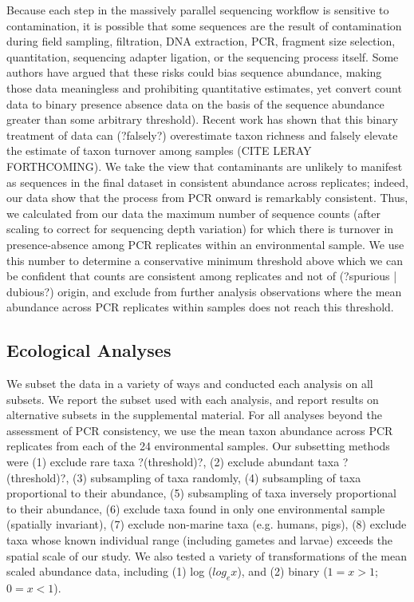 \documentclass[11pt,letterpaper]{article} %
\begin{document}
Because each step in the massively parallel sequencing workflow is sensitive to contamination, it is possible that some sequences are the result of contamination during field sampling, filtration, DNA extraction, PCR, fragment size selection, quantitation, sequencing adapter ligation, or the sequencing process itself.
Some authors have argued that these risks could bias sequence abundance, making those data meaningless and prohibiting quantitative estimates, yet convert count data to binary presence absence data on the basis of the sequence abundance greater than some arbitrary threshold). %
Recent work has shown that this binary treatment of data can (?falsely?) overestimate taxon richness and falsely elevate the estimate of taxon turnover among samples (CITE LERAY FORTHCOMING).
We take the view that contaminants are unlikely to manifest as sequences in the final dataset in consistent abundance across replicates; indeed, our data show that the process from PCR onward is remarkably consistent.
Thus, we calculated from our data the maximum number of sequence counts (after scaling to correct for sequencing depth variation) for which there is turnover in presence-absence among PCR replicates within an environmental sample.
We use this number to determine a conservative minimum threshold above which we can be confident that counts are consistent among replicates and not of (?spurious | dubious?) origin, and exclude from further analysis observations where the mean abundance across PCR replicates within samples does not reach this threshold. %




\subsection*{Ecological Analyses}

We subset the data in a variety of ways and conducted each analysis on all subsets.
We report the subset used with each analysis, and report results on alternative subsets in the supplemental material.
For all analyses beyond the assessment of PCR consistency, we use the mean taxon abundance across PCR replicates from each of the 24 environmental samples.
Our subsetting methods were (1) exclude rare taxa ?(threshold)?, (2) exclude abundant taxa ?(threshold)?, (3) subsampling of taxa randomly, (4) subsampling of taxa proportional to their abundance, (5) subsampling of taxa inversely proportional to their abundance, (6) exclude taxa found in only one environmental sample (spatially invariant), (7) exclude non-marine taxa (e.g. humans, pigs), (8) exclude taxa whose known individual range (including gametes and larvae) exceeds the spatial scale of our study.
We also tested a variety of transformations of the mean scaled abundance data, including (1) log ($log_{e}x$), and (2) binary ($1 = x > 1$; $0 = x < 1$).
\end{document}
